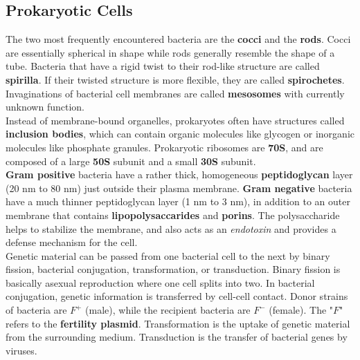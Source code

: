 \documentclass{article}
\theoremstyle{plain}%
\theoremstyle{definition}
\theoremstyle{remark}
\begin{document}
\subsection{Prokaryotic Cells}
The two most frequently encountered bacteria are the \textbf{cocci} and the \textbf{rods}. Cocci are essentially spherical in shape while rods generally resemble the shape of a tube. Bacteria that have a rigid twist to their rod-like structure are called \textbf{spirilla}. If their twisted structure is more flexible, they are called \textbf{spirochetes}. Invaginations of bacterial cell membranes are called \textbf{mesosomes} with currently unknown function. \\
\indent Instead of membrane-bound organelles, prokaryotes often have structures called \textbf{inclusion bodies}, which can contain organic molecules like glycogen or inorganic molecules like phosphate granules. Prokaryotic ribosomes are \textbf{70S}, and are composed of a large \textbf{50S} subunit and a small \textbf{30S} subunit.\\
\textbf{Gram positive} bacteria have a rather thick, homogeneous \textbf{peptidoglycan} layer (20 nm to 80 nm) just outside their plasma membrane. \textbf{Gram negative} bacteria have a much thinner peptidoglycan layer (1 nm to 3 nm), in addition to an outer membrane that contains \textbf{lipopolysaccarides} and \textbf{porins}. The polysaccharide helps to stabilize the membrane, and also acts as an \textit{endotoxin} and provides a defense mechanism for the cell. \\
\indent Genetic material can be passed from one bacterial cell to the next by binary fission, bacterial conjugation, transformation, or transduction. Binary fission is basically asexual reproduction where one cell splits into two. In bacterial conjugation, genetic information is transferred by cell-cell contact. Donor strains of bacteria are $F^+$ (male), while the recipient bacteria are $F^-$ (female). The "$F$" refers to the \textbf{fertility plasmid}. Transformation is the uptake of genetic material from the surrounding medium. Transduction is the transfer of bacterial genes by viruses.
\end{document}
